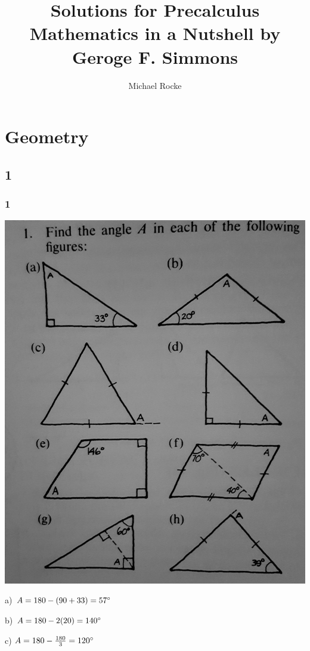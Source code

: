 \documentclass[]{report}
\title{Solutions for Precalculus Mathematics in a Nutshell by Geroge F. Simmons}
\author{Michael Rocke}
\begin{document}
\maketitle

\tableofcontents

\section{Geometry}
\subsection{1}


\subsubsection{1}
\includegraphics[width=\textwidth]{precalc-geo-section1-1.jpg}

a) $A = 180 - (90 + 33) = 57\degree$

b) $A = 180 - 2(20) = 140\degree$

c) $A = 180 - \frac{180}{3} = 120\degree$
\end{document}
